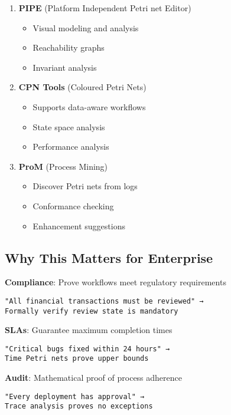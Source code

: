 \documentclass[11pt,a4paper]{article}
\begin{document}
\begin{enumerate}
\item \textbf{PIPE} (Platform Independent Petri net Editor)
   \begin{itemize}
   \item Visual modeling and analysis
   \item Reachability graphs
   \item Invariant analysis
   \end{itemize}

\item \textbf{CPN Tools} (Coloured Petri Nets)
   \begin{itemize}
   \item Supports data-aware workflows
   \item State space analysis
   \item Performance analysis
   \end{itemize}

\item \textbf{ProM} (Process Mining)
   \begin{itemize}
   \item Discover Petri nets from logs
   \item Conformance checking
   \item Enhancement suggestions
   \end{itemize}
\end{enumerate}

\subsection{Why This Matters for Enterprise}

\textbf{Compliance}: Prove workflows meet regulatory requirements
\begin{verbatim}
"All financial transactions must be reviewed" → 
Formally verify review state is mandatory
\end{verbatim}

\textbf{SLAs}: Guarantee maximum completion times
\begin{verbatim}
"Critical bugs fixed within 24 hours" →
Time Petri nets prove upper bounds
\end{verbatim}

\textbf{Audit}: Mathematical proof of process adherence
\begin{verbatim}
"Every deployment has approval" →
Trace analysis proves no exceptions
\end{verbatim}
\end{document}
